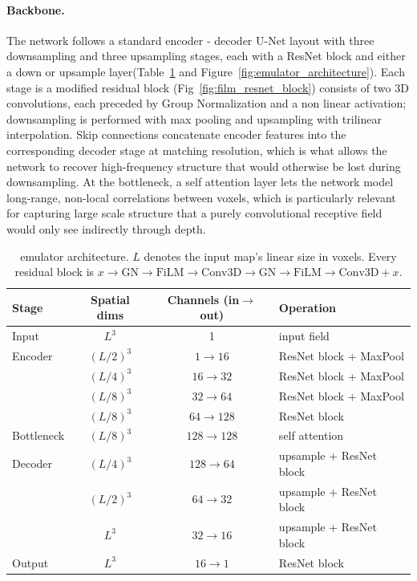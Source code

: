 \paragraph{Backbone.}
The network follows a standard encoder - decoder U-Net layout with three
downsampling and three upsampling stages, each with a ResNet block and either a down or upsample layer(Table~\ref{tab:emu_architecture}
and Figure~\ref{fig:emulator_architecture}). Each stage is a modified residual block (Fig~\ref{fig:film_resnet_block})
consists of two 3D convolutions, each preceded by Group Normalization and
a non linear activation; downsampling is performed with max pooling and
upsampling with trilinear interpolation. Skip connections concatenate
encoder features into the corresponding decoder stage at matching
resolution, which is what allows the network to recover high-frequency
structure that would otherwise be lost during downsampling. At the
bottleneck, a self attention layer lets the network model long-range,
non-local correlations between voxels, which is particularly relevant for
capturing large scale structure that a purely convolutional receptive field
would only see indirectly through depth.

\begin{table}[t]
    \centering
    \caption{\HGL emulator architecture. $L$ denotes the input map's linear
    size in voxels. Every residual block is
    $x \rightarrow \mathrm{GN} \rightarrow \mathrm{FiLM} \rightarrow
    \mathrm{Conv3D} \rightarrow \mathrm{GN} \rightarrow \mathrm{FiLM}
    \rightarrow \mathrm{Conv3D} + x$.}
    \label{tab:emu_architecture}
    \begin{tabular}{l c c l}
        \toprule
        \textbf{Stage} & \textbf{Spatial dims} & \textbf{Channels (in$\to$out)} & \textbf{Operation} \\
        \midrule
        Input     & $L^3$     & 1                        & input field \\
        Encoder   & $(L/2)^3$ & $1 \to 16$       & ResNet block + MaxPool \\
                  & $(L/4)^3$ & $16 \to 32$      & ResNet block + MaxPool \\
                  & $(L/8)^3$ & $32 \to 64$     & ResNet block + MaxPool \\
                  & $(L/8)^3$ & $64 \to 128$     & ResNet block \\
        Bottleneck& $(L/8)^3$ & $128 \to 128$    & self attention \\
        Decoder   & $(L/4)^3$ & $128 \to 64$     & upsample + ResNet block \\
                  & $(L/2)^3$ & $64 \to 32$      & upsample + ResNet block \\
                  & $L^3$     & $32 \to 16$      & upsample + ResNet block \\
        Output    & $L^3$     & $16 \to 1$      & ResNet block \\
        \bottomrule
    \end{tabular}
\end{table}


